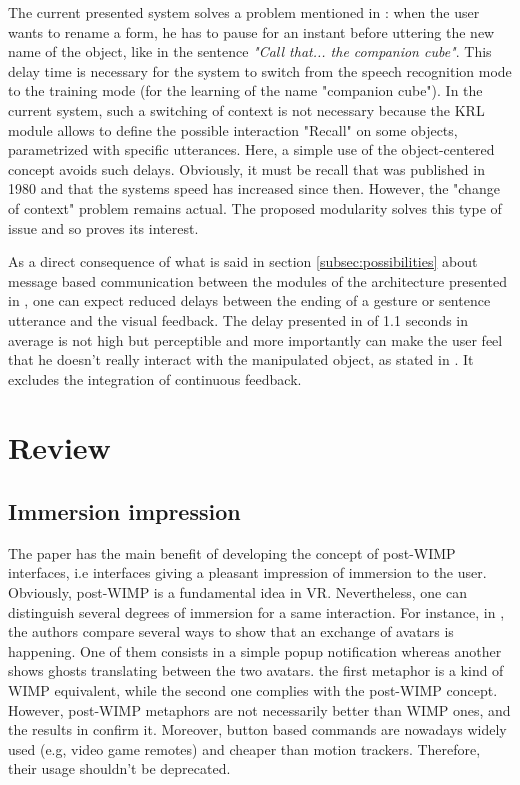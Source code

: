 \documentclass[a4paper]{article}
\begin{document}
The current presented system solves a problem mentioned in \cite{putthatthere}: when the user wants to rename a form, he has to pause for an instant before uttering the new name of the object, like in the sentence \textit{"Call that... the companion cube"}. This delay time is necessary for the system to switch from the speech recognition mode to the training mode (for the learning of the name "companion cube"). In the current system, such a switching of context is not necessary because the KRL module allows to define the possible interaction "Recall" on some objects, parametrized with specific utterances. Here, a simple use of the object-centered concept avoids such delays. Obviously, it must be recall that \cite{putthatthere} was published in 1980 and that the systems speed has increased since then. However, the "change of context" problem remains actual. The proposed modularity solves this type of issue and so proves its interest.

As a direct consequence of what is said in section \ref{subsec:possibilities} about message based communication between the modules of the architecture presented in \cite{kaiser}, one can expect reduced delays between the ending of a gesture or sentence utterance and the visual feedback. The delay presented in \cite{kaiser} of 1.1 seconds in average is not high but perceptible and more importantly can make the user feel that he doesn't really interact with the manipulated object, as stated in \cite{responsetime}. It excludes the integration of continuous feedback.

\section{Review}

\subsection{Immersion impression}
The paper has the main benefit of developing the concept of post-WIMP interfaces, i.e interfaces giving a pleasant impression of immersion to the user. Obviously, post-WIMP is a fundamental idea in VR. Nevertheless, one can distinguish several degrees of immersion for a same interaction. For instance, in \cite{avatars}, the authors compare several ways to show that an exchange of avatars is happening. One of them consists in a simple popup notification whereas another shows ghosts translating between the two avatars. the first metaphor is a kind of WIMP equivalent, while the second one complies with the post-WIMP concept. However, post-WIMP metaphors are not necessarily better than WIMP ones, and the results in \cite{avatars} confirm it. Moreover, button based commands are nowadays widely used (e.g, video game remotes) and cheaper than motion trackers. Therefore, their usage shouldn't be deprecated.
\end{document}
